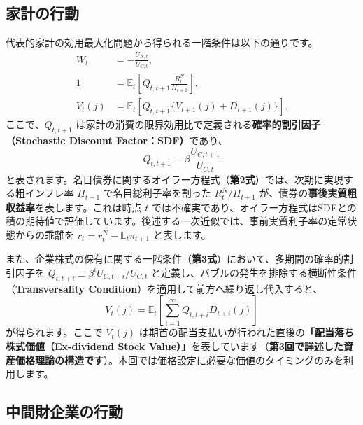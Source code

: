 \documentclass[
  japanese,
  lualatex,
  ja=standard,
  12pt,
  a4paper]{ltjsarticle}
\begin{document}
\subsection{家計の行動}\label{ux5bb6ux8a08ux306eux884cux52d5}

代表的家計の効用最大化問題から得られる一階条件は以下の通りです。 \[
\begin{aligned}
W_t&=-\frac{U_{N,t}}{U_{C,t}},\\
1&=\mathbb{E}_t\left[Q_{t,t+1}\frac{R_t^N}{\Pi_{t+1}}\right],\\
V_t(j)&=\mathbb{E}_t\left[Q_{t,t+1}\{V_{t+1}(j)+D_{t+1}(j)\}\right].
\end{aligned}
\] ここで、\(Q_{t,t+1}\)
は家計の消費の限界効用比で定義される\textbf{確率的割引因子（Stochastic
Discount Factor：SDF）}であり、 \[
Q_{t,t+1}\equiv \beta\frac{U_{C,t+1}}{U_{C,t}}
\]
と表されます。名目債券に関するオイラー方程式（\textbf{第2式}）では、次期に実現する粗インフレ率
\(\Pi_{t+1}\) で名目総利子率を割った \(R_t^N/\Pi_{t+1}\)
が、債券の\textbf{事後実質粗収益率}を表します。これは時点 \(t\)
では不確実であり、オイラー方程式はSDFとの積の期待値で評価しています。後述する一次近似では、事前実質利子率の定常状態からの乖離を
\(r_t=r_t^N-\mathbb{E}_t\pi_{t+1}\) と表します。

また、企業株式の保有に関する一階条件（\textbf{第3式}）において、多期間の確率的割引因子を
\(Q_{t,t+i}\equiv \beta^i U_{C,t+i}/U_{C,t}\)
と定義し、バブルの発生を排除する横断性条件（\textbf{Transversality
Condition}）を適用して前方へ繰り返し代入すると、 \[
V_t(j)
=
\mathbb{E}_t
\left[
\sum_{i=1}^{\infty}
Q_{t,t+i}D_{t+i}(j)
\right]
\] が得られます。ここで \(V_t(j)\)
は期首の配当支払いが行われた直後の\textbf{「配当落ち株式価値（Ex-dividend
Stock
Value）」}を表しています（\textbf{第3回で詳述した資産価格理論の構造です}）。本回では価格設定に必要な価値のタイミングのみを利用します。

\subsection{中間財企業の行動}\label{ux4e2dux9593ux8ca1ux4f01ux696dux306eux884cux52d5}
\end{document}
